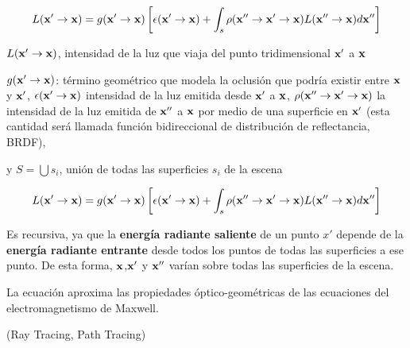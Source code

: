 \documentclass[spanish]{beamer}
\begin{document}
\begin{frame}
$$ L(\bold{x'} \rightarrow \bold{x}) =  g(\bold{x'}  \rightarrow \bold{x})  \left[ \epsilon(\bold{x'}  \rightarrow \bold{x}) + \int_{s}{\rho(\bold{x''}  \rightarrow \bold{x'}  \rightarrow \bold{x})L(\bold{x''}  \rightarrow \bold{x}) d\bold{x''}} \right] $$

$L(\bold{x'} \rightarrow \bold{x})$, intensidad de la luz que viaja del punto tridimensional $\bold{x'}$ a $\bold{x}$

$g(\bold{x'} \rightarrow \bold{x})$: término geométrico que modela la oclusión que podría existir entre $\bold{x}$ y $\bold{x'}$, $\epsilon(\bold{x'} \rightarrow \bold{x})$ intensidad de la luz emitida desde $\bold{x'}$ a $\bold{x}$, $\rho(\bold{x''}  \rightarrow \bold{x'}  \rightarrow \bold{x})$ la intensidad de la luz emitida de $\bold{x''}$ a $\bold{x}$ por medio de una superficie en $\bold{x'}$ (esta cantidad será llamada función bidireccional de distribución de reflectancia, BRDF),

y $S=\bigcup{s_{i}}$, unión de todas las superficies $s_{i}$ de la escena
\end{frame}

\begin{frame}

\begin{equation*}
L(\bold{x'} \rightarrow \bold{x}) =  g(\bold{x'}  \rightarrow \bold{x})  \left[ \epsilon(\bold{x'}  \rightarrow \bold{x}) + \int_{s}{\rho(\bold{x''}  \rightarrow \bold{x'}  \rightarrow \bold{x})L(\bold{x''}  \rightarrow \bold{x}) d\bold{x''}} \right]
\end{equation*}

Es recursiva, ya que la \textbf{energía radiante saliente} de un punto $x'$ depende de la \textbf{energía radiante entrante} desde todos los puntos de todas las superficies a ese punto.
De esta forma, $\bold{x}$,$\bold{x'}$ y $\bold{x''}$ varían sobre todas las superficies de la escena.

La ecuación aproxima las propiedades óptico-geométricas de las ecuaciones del electromagnetismo de Maxwell.

(Ray Tracing, Path Tracing)
\end{frame}
\end{document}
